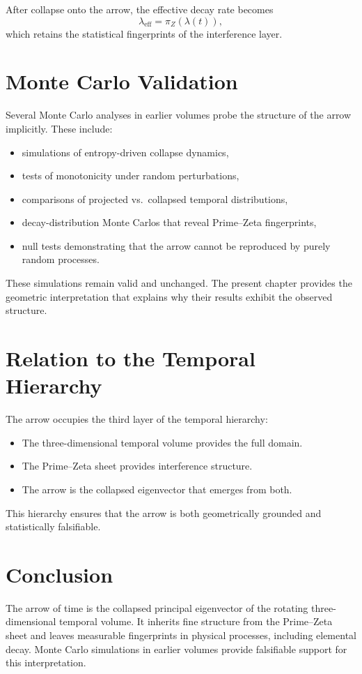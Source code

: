 \documentclass[11pt, letterpaper, openany]{book}
\begin{document}
After collapse onto the arrow, the effective decay rate becomes
\[
\lambda_{\mathrm{eff}} = \pi_Z(\lambda(t)),
\]
which retains the statistical fingerprints of the interference layer.

\section{Monte Carlo Validation}

Several Monte Carlo analyses in earlier volumes probe the structure of the 
arrow implicitly. These include:

\begin{itemize}
    \item simulations of entropy-driven collapse dynamics,
    \item tests of monotonicity under random perturbations,
    \item comparisons of projected vs.\ collapsed temporal distributions,
    \item decay-distribution Monte Carlos that reveal Prime--Zeta fingerprints,
    \item null tests demonstrating that the arrow cannot be reproduced by 
          purely random processes.
\end{itemize}

These simulations remain valid and unchanged. 
The present chapter provides the geometric interpretation that explains why 
their results exhibit the observed structure.

\section{Relation to the Temporal Hierarchy}

The arrow occupies the third layer of the temporal hierarchy:

\begin{itemize}
    \item The three-dimensional temporal volume provides the full domain.
    \item The Prime--Zeta sheet provides interference structure.
    \item The arrow is the collapsed eigenvector that emerges from both.
\end{itemize}

This hierarchy ensures that the arrow is both geometrically grounded and 
statistically falsifiable.

\section{Conclusion}
The arrow of time is the collapsed principal eigenvector of the rotating 
three-dimensional temporal volume. 
It inherits fine structure from the Prime--Zeta sheet and leaves measurable 
fingerprints in physical processes, including elemental decay. 
Monte Carlo simulations in earlier volumes provide falsifiable support for 
this interpretation.
\end{document}
